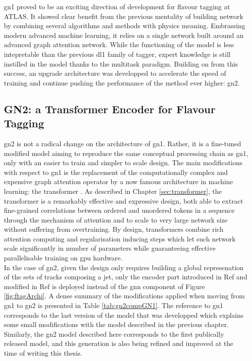 \gls{gn1} proved to be an exciting direction of development for flavour tagging at ATLAS. It showed clear benefit from the previous mentality of building network by combining several algorithms and methods with physics meaning. Embrassing modern advanced machine learning, it relies on a single network built around an advanced graph attention network. While the functioning of the model is less intepretable than the previous \gls{dl1} family of tagger, expert knowledge is still instilled in the model thanks to the multitask paradigm. Building on from this success, an upgrade architecture was developped to accelerate the speed of training and continue pushing the performance of the method ever higher: \gls{gn2}.

\subsection{GN2: a Transformer Encoder for Flavour Tagging}\label{chap-GN2}
\gls{gn2} is not a radical change on the architecture of \gls{gn1}. Rather, it is a fine-tuned modified model aiming to reproduce the same conceptual processing chain as \gls{gn1}, only with an easier to train and simpler to scale design. The main modifications with respect to \gls{gn1} is the replacement of the computationally complex and expensive graph attention operator by a now famous architecture in machine learning: the transformer \cite{NIPS_transformerPaper}. As described in Chapter \ref{sec:transformer}, the transformer is a remarkably effective and expressive design, both able to extract fine-grained correlations between ordered and unordered tokens in a sequence through the mechanism of attention and to scale to very large network size without suffering from overtraining. By design, transformers combine rich attention computing and regularisation inducing steps which let such network scale significantly in number of parameters while guaranteeing effective parallelisable training on \gls{gpu} hardware. \\

In the case of \gls{gn2}, given the design only requires building a global represenation of the sets of tracks composing a jet, only the encoder part introduced in Ref \cite{NIPS_transformerPaper} and modified in Ref \cite{shleifer2021normformer} is deployed instead of the \gls{gnn} component of Figure \ref{fig:ftagArchi}. A dense summary of the modifications applied when moving from \gls{gn1} to \gls{gn2} is presented in Table \ref{tab:gn2compGN1}. The reference to \gls{gn1} corresponds to the last version of the model that was developped which explains some small modifications with the model described in the previous chapter. Similarly, the \gls{gn2} model described here corresponds to the first publically released model, and this generation is also being refined and improved at the time of writing this thesis. 

